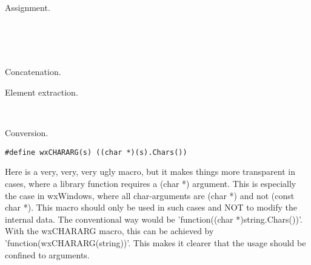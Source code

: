 Assignment.
 
\label{wxstringPlusEqual}

\\
\\
\\

Concatenation.

\label{wxstringoperatorbracket}


Element extraction.

\label{wxstringoperatorparenth}


\label{wxstringoperatorout}
\\

\label{wxstringoperatorin}

\label{wxstringoperatorconstcharpt}
 

Conversion.

\label{wxstringwxCHARARG}

\begin{verbatim}
#define wxCHARARG(s) ((char *)(s).Chars())  
\end{verbatim}

Here is a very, very, very ugly macro, but it makes things more
transparent in cases, where a library function requires a 
(char *) argument. This is especially the case in wxWindows,
where all char-arguments are (char *) and not (const char *).
This macro should only be used in such cases and NOT to
modify the internal data.
The conventional way would be 'function((char *)string.Chars())'.
With the wxCHARARG macro, this can be achieved by 'function(wxCHARARG(string))'.
This makes it clearer that the usage should be confined
to arguments.


